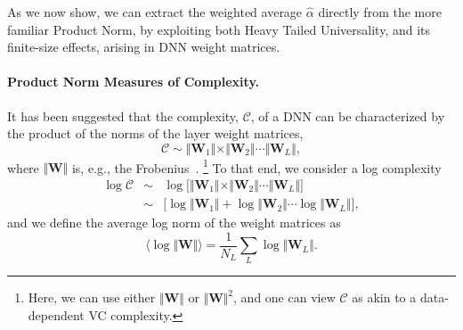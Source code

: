 As we now show, we can extract the weighted average $\hat{\alpha}$ directly from the more familiar Product Norm, by exploiting both Heavy Tailed Universality, and its finite-size effects, arising
in DNN weight matrices.



\paragraph{Product Norm Measures of Complexity.} 


It has been suggested that the complexity, $\mathcal{C}$, of a DNN can be characterized by the product of the norms of the layer weight matrices,
$$
\mathcal{C}\sim\Vert\mathbf{W}_{1}\Vert\times\Vert\mathbf{W}_{2}\Vert\cdots\Vert\mathbf{W}_{L}\Vert ,
$$
where $\Vert\mathbf{W}\Vert$ is, e.g., the Frobenius~\cite{XXX-XXX,XXX-XXX,XXX-XXX}.%
\footnote{Here, we can use either $\Vert\mathbf{W}\Vert$ or $\Vert\mathbf{W}\Vert^{2}$,
and one can view $\mathcal{C}$ as akin to a data-dependent VC complexity.}
%
To that end, we consider a log complexity
\begin{eqnarray*}
\log\mathcal{C} &\sim& \log\bigg[\Vert\mathbf{W}_{1}\Vert\times\Vert\mathbf{W}_{2}\Vert\cdots\Vert\mathbf{W}_{L}\Vert\bigg]  \\
                &\sim& \bigg[\log\Vert\mathbf{W}_{1}\Vert+\log\Vert\mathbf{W}_{2}\Vert\cdots\log\Vert\mathbf{W}_{L}\Vert\bigg]  ,
\end{eqnarray*}
and we define the average log norm of the weight matrices as
\begin{equation}
\langle\log\Vert\mathbf{W}\Vert\rangle=\dfrac{1}{N_{L}}\sum_{L}\log\Vert\mathbf{W}_{L}\Vert  .
\label{eqn:av_log_norm}
\end{equation}

